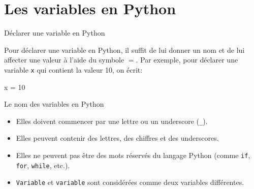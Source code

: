 \def\level{Première}  %
\def\course{NSI}
\def\chaptername{Constructions élémentaires} %
\def\docname{AP01}        %

\pagestyle{cours_FP}
\makeheader{} %


\section{Les variables en Python}

\begin{easybox}{Déclarer une variable en Python}

	Pour déclarer une variable en Python, il suffit de lui donner un nom et de lui affecter une valeur à l'aide du symbole $=$. Par exemple, pour déclarer une variable \texttt{x} qui contient la valeur 10, on écrit:

\begin{minipage}{0.48\linewidth}
	\begin{CodePythontexAlt}[TaillePolice=\normalsize, Largeur=1\linewidth,Centre,PremLigne=1, Lignes=false,]{}
    x = 10
    \end{CodePythontexAlt}
\end{minipage}\hfill{}
\begin{minipage}{0.38\linewidth}
    \begin{center}
    \begin{scratch}
\end{scratch}
    \end{center}

\end{minipage}
\end{easybox}


\begin{easybox}{Le nom des variables en Python}
	\begin{itemize}
		\item Elles doivent commencer par une lettre ou un underscore (\texttt{\_}).
		\item Elles peuvent contenir des lettres, des chiffres et des underscores.
		\item Elles ne peuvent pas être des mots réservés du langage Python (comme \texttt{if}, \texttt{for}, \texttt{while}, etc.).
		\item \texttt{Variable} et \texttt{variable} sont considérées comme deux variables différentes.
	\end{itemize}
\end{easybox}

